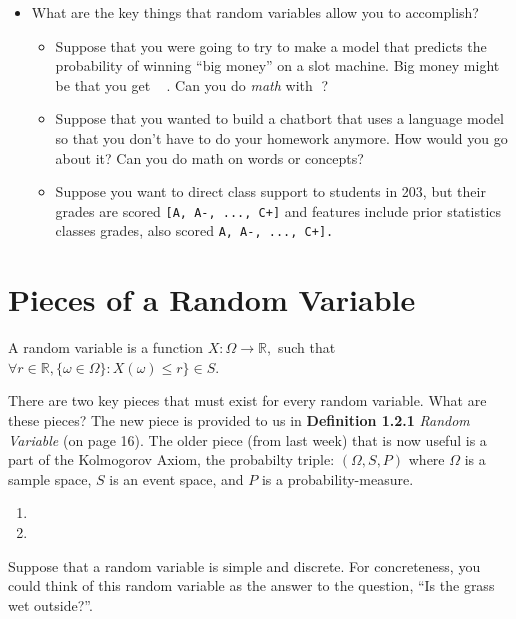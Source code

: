 \documentclass[
  letterpaper,
  DIV=11,
  numbers=noendperiod]{scrreprt}
\providecommand{\tightlist}{%
  \setlength{\itemsep}{0pt}\setlength{\parskip}{0pt}}\usepackage{longtable,booktabs,array}
\begin{document}
\begin{itemize}
\tightlist
\item
  What are the key things that random variables allow you to accomplish?

  \begin{itemize}
  \tightlist
  \item
    Suppose that you were going to try to make a model that predicts the
    probability of winning ``big money'' on a slot machine. Big money
    might be that you get 🍒🍒🍒. Can you do \emph{math} with 🍒?
  \item
    Suppose that you wanted to build a chatbort that uses a language
    model so that you don't have to do your homework anymore. How would
    you go about it? Can you do math on words or concepts?
  \item
    Suppose you want to direct class support to students in 203, but
    their grades are scored \texttt{{[}A,\ A-,\ ...,\ C+{]}} and
    features include prior statistics classes grades, also scored
    \texttt{A,\ A-,\ ...,\ C+{]}.}
  \end{itemize}
\end{itemize}

\section{Pieces of a Random Variable}\label{pieces-of-a-random-variable}

A random variable is a function \(X : \Omega \rightarrow \mathbb{R},\)
such that
\(\forall r \in \mathbb{R}, \{\omega \in \Omega\}: X(\omega) \leq r\} \in S\).

There are two key pieces that must exist for every random variable. What
are these pieces? The new piece is provided to us in \textbf{Definition
1.2.1} \emph{Random Variable} (on page 16). The older piece (from last
week) that is now useful is a part of the Kolmogorov Axiom, the
probabilty triple: \((\Omega, S, P)\) where \(\Omega\) is a sample
space, \(S\) is an event space, and \(P\) is a probability-measure.

\begin{enumerate}
\def\labelenumi{\arabic{enumi}.}
\tightlist
\item
\item
\end{enumerate}

Suppose that a random variable is simple and discrete. For concreteness,
you could think of this random variable as the answer to the question,
``Is the grass wet outside?''.
\end{document}
